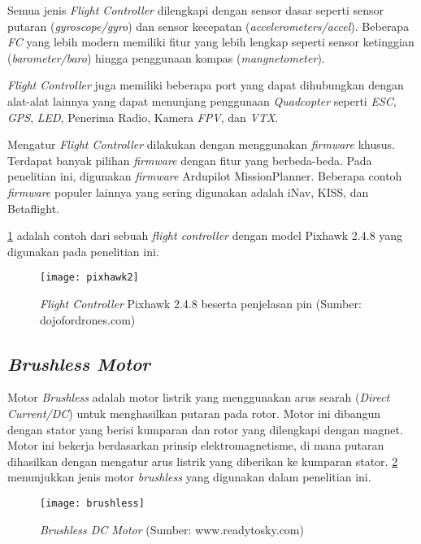 Semua jenis \textit{Flight Controller} dilengkapi dengan sensor dasar seperti sensor putaran (\textit{gyroscope/gyro}) dan sensor kecepatan (\textit{accelerometers/accel}). Beberapa \textit{FC} yang lebih modern memiliki fitur yang lebih lengkap seperti sensor ketinggian (\textit{barometer/baro}) hingga penggunaan kompas (\textit{mangnetometer}).

\textit{Flight Controller} juga memiliki beberapa port yang dapat dihubungkan dengan alat-alat lainnya yang dapat menunjang penggunaan \textit{Quadcopter} seperti \textit{ESC}, \textit{GPS}, \textit{LED}, Penerima Radio, Kamera \textit{FPV}, dan \textit{VTX}.

Mengatur \textit{Flight Controller} dilakukan dengan menggunakan \textit{firmware} khusus. Terdapat banyak pilihan \textit{firmware} dengan fitur yang berbeda-beda. Pada penelitian ini, digunakan \textit{firmware} Ardupilot MissionPlanner. Beberapa contoh \textit{firmware} populer lainnya yang sering digunakan adalah iNav, KISS, dan Betaflight.

\cref{fig:pixhawk2} adalah contoh dari sebuah \textit{flight controller} dengan model Pixhawk 2.4.8 yang digunakan pada penelitian ini.

\begin{figure}[H]
	\centering
	\texttt{[image: pixhawk2]}
	\caption{\textit{Flight Controller} Pixhawk 2.4.8 beserta penjelasan pin (Sumber: dojofordrones.com)}
	\label{fig:pixhawk2}
\end{figure}

\subsection{\textit{Brushless Motor}}
Motor \textit{Brushless} adalah motor listrik yang menggunakan arus searah (\textit{Direct Current/DC}) untuk menghasilkan putaran pada rotor. Motor ini dibangun dengan stator yang berisi kumparan dan rotor yang dilengkapi dengan magnet. Motor ini bekerja berdasarkan prinsip elektromagnetisme, di mana putaran dihasilkan dengan mengatur arus listrik yang diberikan ke kumparan stator. \cref{fig:brushless} menunjukkan jenis motor \textit{brushless} yang digunakan dalam penelitian ini.

\begin{figure}[H]
	\centering
	\texttt{[image: brushless]}
	\caption{\textit{Brushless DC Motor} (Sumber: www.readytosky.com)}
	\label{fig:brushless}
\end{figure}

